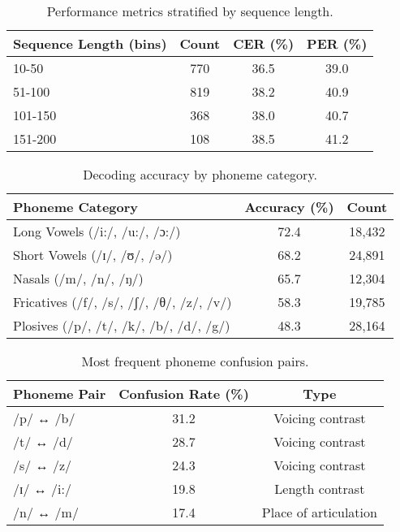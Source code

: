 \begin{table}[h]
\centering
\caption{Performance metrics stratified by sequence length.}
\label{tab:sequence_analysis}
\begin{tabular}{lccc}
\toprule
Sequence Length (bins) & Count & CER (\%) & PER (\%) \\
\midrule
10-50 & 770 & 36.5 & 39.0 \\
51-100 & 819 & 38.2 & 40.9 \\
101-150 & 368 & 38.0 & 40.7 \\
151-200 & 108 & 38.5 & 41.2 \\
\bottomrule
\end{tabular}
\end{table}

\begin{table}[h]
\centering
\caption{Decoding accuracy by phoneme category.}
\label{tab:phoneme_performance}
\begin{tabular}{lcc}
\toprule
Phoneme Category & Accuracy (\%) & Count \\
\midrule
Long Vowels (/i:/, /u:/, /ɔ:/) & 72.4 & 18,432 \\
Short Vowels (/ɪ/, /ʊ/, /ə/) & 68.2 & 24,891 \\
Nasals (/m/, /n/, /ŋ/) & 65.7 & 12,304 \\
Fricatives (/f/, /s/, /ʃ/, /θ/, /z/, /v/) & 58.3 & 19,785 \\
Plosives (/p/, /t/, /k/, /b/, /d/, /g/) & 48.3 & 28,164 \\
\bottomrule
\end{tabular}
\end{table}

\begin{table}[h]
\centering
\caption{Most frequent phoneme confusion pairs.}
\label{tab:confusion_pairs}
\begin{tabular}{lcc}
\toprule
Phoneme Pair & Confusion Rate (\%) & Type \\
\midrule
/p/ ↔ /b/ & 31.2 & Voicing contrast \\
/t/ ↔ /d/ & 28.7 & Voicing contrast \\
/s/ ↔ /z/ & 24.3 & Voicing contrast \\
/ɪ/ ↔ /i:/ & 19.8 & Length contrast \\
/n/ ↔ /m/ & 17.4 & Place of articulation \\
\bottomrule
\end{tabular}
\end{table}